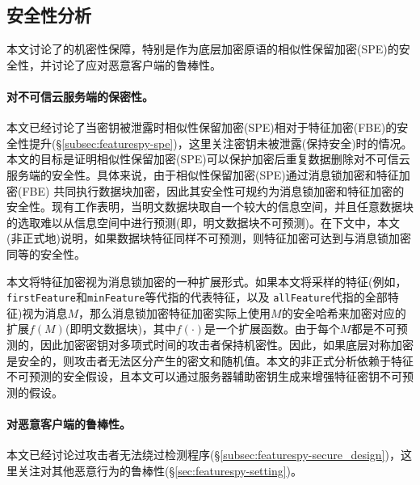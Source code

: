 
\subsection{安全性分析}
\label{subsec:featurespy-security}
本文讨论了\sysnameF 的机密性保障，特别是作为底层加密原语的相似性保留加密(SPE)的安全性，并讨论了\sysnameF 应对恶意客户端的鲁棒性。

\paragraph*{对不可信云服务端的保密性。}

本文已经讨论了当密钥被泄露时相似性保留加密(SPE)相对于特征加密(FBE)的安全性提升(\S\ref{subsec:featurespy-spe})，这里关注密钥未被泄露(保持安全)时的情况。本文的目标是证明相似性保留加密(SPE)可以保护加密后重复数据删除对不可信云服务端的安全性。具体来说，由于相似性保留加密(SPE)通过消息锁加密和特征加密(FBE) 共同执行数据块加密，因此其安全性可规约为消息锁加密和特征加密的安全性。现有工作\cite{bellare2013MLE}表明，当明文数据块取自一个较大的信息空间，并且任意数据块的选取难以从信息空间中进行预测(即，明文数据块不可预测)。在下文中，本文(非正式地)说明，如果数据块特征同样不可预测，则特征加密可达到与消息锁加密同等的安全性。

本文将特征加密视为消息锁加密的一种扩展形式。如果本文将采样的特征(例如，{\tt firstFeature}和{\tt minFeature}等代指的代表特征，以及 {\tt allFeature}代指的全部特征)视为消息$M$，那么消息锁加密特征加密实际上使用$M$的安全哈希来加密对应的扩展$f(M)$(即明文数据块)，其中$f(\cdot)$是一个扩展函数。由于每个$M$都是不可预测的，因此加密密钥对多项式时间的攻击者保持机密性。因此，如果底层对称加密是安全的，则攻击者无法区分产生的密文和随机值。本文的非正式分析依赖于特征不可预测的安全假设，且本文可以通过服务器辅助密钥生成\cite{bellare2013DupLESS}来增强特征密钥不可预测的假设。

\paragraph*{对恶意客户端的鲁棒性。}
本文已经讨论过攻击者无法绕过检测程序(\S\ref{subsec:featurespy-secure_design})，这里关注\sysnameF 对其他恶意行为的鲁棒性(\S\ref{sec:featurespy-setting})。


